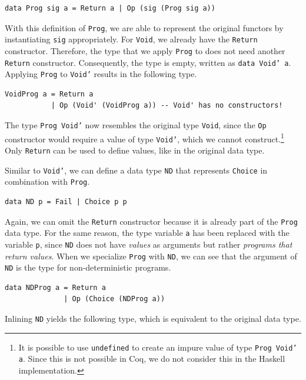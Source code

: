 \documentclass[a4paper, 11pt, fleqn, twoside, abstract=on]{scrreprt}
\newcommand{\hinl}[1]{\texttt{#1}}
\newcommand{\cinl}[1]{\texttt{#1}}
\begin{document}
\begin{verbatim}
data Prog sig a = Return a | Op (sig (Prog sig a))
\end{verbatim}

With this definition of \hinl{Prog}, we are able to represent the original functors by instantiating \hinl{sig} appropriately.
For \hinl{Void}, we already have the \hinl{Return} constructor.
Therefore, the type that we apply \hinl{Prog} to does not need another \hinl{Return} constructor.
Consequently, the type is empty, written as \hinl{data Void' a}.
Applying \cinl{Prog} to \cinl{Void'} results in the following type.

\begin{verbatim}
VoidProg a = Return a
           | Op (Void' (VoidProg a)) -- Void' has no constructors!
\end{verbatim}

The type \hinl{Prog Void'} now resembles the original type \hinl{Void}, since the \hinl{Op} constructor would require a value of type \hinl{Void'}, which we cannot construct.\footnote{It is possible to use \texttt{undefined} to create an impure value of type \texttt{Prog Void' a}.
Since this is not possible in Coq, we do not consider this in the Haskell implementation.}
Only \hinl{Return} can be used to define values, like in the  original data type.

Similar to \hinl{Void'}, we can define a data type \hinl{ND} that represents \hinl{Choice} in combination with \hinl{Prog}.

\label{min:ND}
\begin{verbatim}
data ND p = Fail | Choice p p
\end{verbatim}

Again, we can omit the \hinl{Return} constructor because it is  already part of the \hinl{Prog} data type.
For the same reason,  the type variable \hinl{a} has been replaced with the variable \hinl{p}, since \hinl{ND} does not have \textit{values} as arguments but rather \textit{programs that return values}.
When we specialize \hinl{Prog} with \hinl{ND}, we can see that the argument of \hinl{ND} is the type for non-deterministic programs.

\begin{verbatim}
data NDProg a = Return a
              | Op (Choice (NDProg a))
\end{verbatim}

Inlining \hinl{ND} yields the following type, which is equivalent to the original data type.
\end{document}

